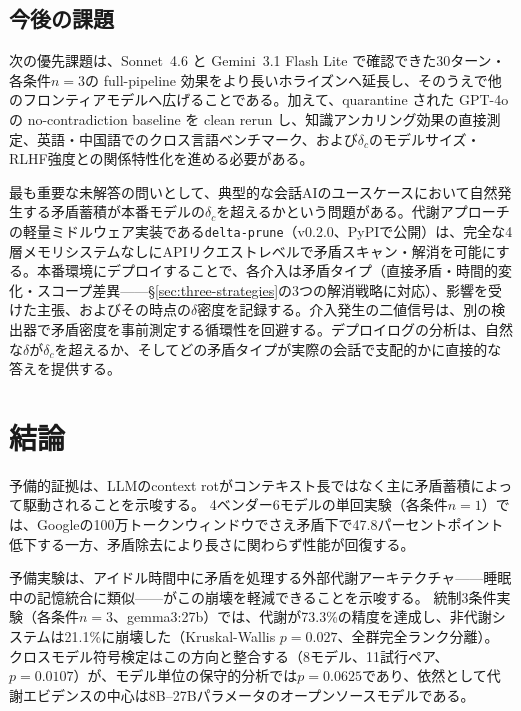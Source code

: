 \documentclass[11pt,a4paper]{article}
\begin{document}
\subsection{今後の課題}

次の優先課題は、Sonnet~4.6 と Gemini~3.1 Flash Lite で確認できた30ターン・各条件$n = 3$の full-pipeline 効果をより長いホライズンへ延長し、そのうえで他のフロンティアモデルへ広げることである。加えて、quarantine された GPT-4o の no-contradiction baseline を clean rerun し、知識アンカリング効果の直接測定、英語・中国語でのクロス言語ベンチマーク、および$\delta_c$のモデルサイズ・RLHF強度との関係特性化を進める必要がある。

最も重要な未解答の問いとして、典型的な会話AIのユースケースにおいて自然発生する矛盾蓄積が本番モデルの$\delta_c$を超えるかという問題がある。代謝アプローチの軽量ミドルウェア実装である\texttt{delta-prune}（v0.2.0、PyPIで公開）は、完全な4層メモリシステムなしにAPIリクエストレベルで矛盾スキャン・解消を可能にする。本番環境にデプロイすることで、各介入は矛盾タイプ（直接矛盾・時間的変化・スコープ差異——\S\ref{sec:three-strategies}の3つの解消戦略に対応）、影響を受けた主張、およびその時点の$\delta$密度を記録する。介入発生の二値信号は、別の検出器で矛盾密度を事前測定する循環性を回避する。デプロイログの分析は、自然な$\delta$が$\delta_c$を超えるか、そしてどの矛盾タイプが実際の会話で支配的かに直接的な答えを提供する。

\section{結論}
\label{sec:conclusion}

予備的証拠は、LLMのcontext rotがコンテキスト長ではなく主に矛盾蓄積によって駆動されることを示唆する。
4ベンダー6モデルの単回実験（各条件$n = 1$）では、Googleの100万トークンウィンドウでさえ矛盾下で47.8パーセントポイント低下する一方、矛盾除去により長さに関わらず性能が回復する。

予備実験は、アイドル時間中に矛盾を処理する外部代謝アーキテクチャ——睡眠中の記憶統合に類似——がこの崩壊を軽減できることを示唆する。
統制3条件実験（各条件$n = 3$、gemma3:27b）では、代謝が73.3\%の精度を達成し、非代謝システムは21.1\%に崩壊した（Kruskal-Wallis $p = 0.027$、全群完全ランク分離）。
クロスモデル符号検定はこの方向と整合する（8モデル、11試行ペア、$p = 0.0107$）が、モデル単位の保守的分析では$p = 0.0625$であり、依然として代謝エビデンスの中心は8B--27Bパラメータのオープンソースモデルである。
\end{document}
